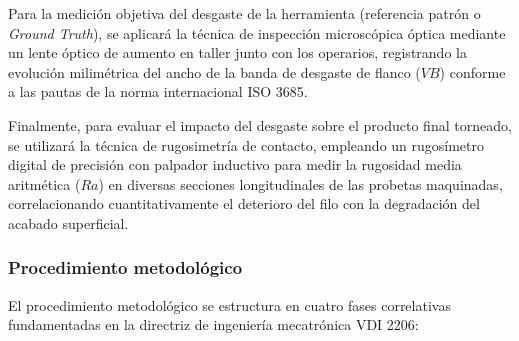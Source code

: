 Para la medición objetiva del desgaste de la herramienta (referencia patrón o \textit{Ground Truth}), se aplicará la técnica de inspección microscópica óptica mediante un lente óptico de aumento en taller junto con los operarios, registrando la evolución milimétrica del ancho de la banda de desgaste de flanco ($VB$) conforme a las pautas de la norma internacional ISO 3685.

Finalmente, para evaluar el impacto del desgaste sobre el producto final torneado, se utilizará la técnica de rugosimetría de contacto, empleando un rugosímetro digital de precisión con palpador inductivo para medir la rugosidad media aritmética ($Ra$) en diversas secciones longitudinales de las probetas maquinadas, correlacionando cuantitativamente el deterioro del filo con la degradación del acabado superficial.

\subsubsection{Procedimiento metodológico}
\label{subsubsec:procedimiento_metodologico}

El procedimiento metodológico se estructura en cuatro fases correlativas fundamentadas en la directriz de ingeniería mecatrónica VDI 2206:

